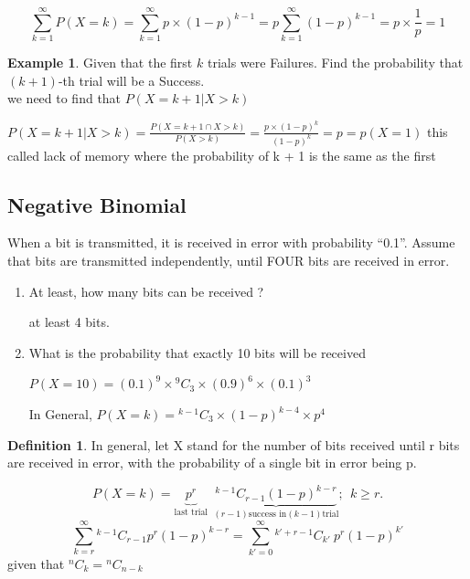 \documentclass[12pt]{article}
\theoremstyle{definition}
\newtheorem{exmp}{Example}[section]
\newtheorem{slo}{Definition}[section]
\newcommand*{\Comb}[2]{{}^{#1}C_{#2}}%
\begin{document}
\begin{equation}
    \displaystyle \sum_{k = 1}^{\infty}   P(X = k) = \sum_{k = 1}^{\infty}p \times (1 - p)^{k-1}
    = p\sum_{k = 1}^{\infty}(1 - p)^{k-1} = p \times \frac{1}{p} = 1
\end{equation}    
\begin{exmp}
    Given that the first $k$ trials were Failures. Find the probability that $(k+1)$-th trial will be a Success. \\

    we need to find that $P(X = k + 1 | X > k)$
    \begin{center}
        $ \displaystyle  P(X = k + 1 | X > k) = \frac{P(X=k+1 \cap X>k)}{P(X>k)}
        = \frac{p \times (1-p)^k}{(1-p)^k} = p = p(X = 1)$  this called lack of memory where the probability
        of k + 1 is the same as the first
    \end{center}
\end{exmp}    
\subsection{Negative Binomial}
When a bit is transmitted, it is received in error with probability “0.1”.
Assume that bits are transmitted independently, until FOUR bits are received in error.
\begin{enumerate}
    \item At least, how many bits can be received ?
        \begin{center}
            at least 4 bits.
        \end{center}   
    \item What is the probability that exactly 10 bits will be received
        \begin{center}
            $  P(X= 10) = (0.1)^9 \times \Comb{9}{3} \times (0.9)^6 \times (0.1)^3 $
        \end{center}   
        In General, $P(X = k) = \Comb{k-1}{3} \times (1-p)^{k-4} \times p^4$

\end{enumerate}   
\begin{slo}
    In general, let X stand for the number of bits
    received until r bits are received in error, with
    the probability of a single bit in error being p.
\end{slo}   
\begin{equation}
    P(X = k) =  \underbrace{p^r}_{\text{last trial}} 
    \ \ \underbrace{\Comb{k-1}{r-1} (1-p)^{k-r}}_{\text{$(r - 1)$success in$(k - 1)$trial}}; \ \ k \geq r. 
\end{equation}
\begin{equation}
    \displaystyle \sum_{k=r}^{\infty} \Comb{k-1}{r-1} p^r(1-p)^{k-r} =
    \sum_{k' = 0}^{\infty} \Comb{k' + r -1}{k'} \ p^r (1-p)^{k'}
\end{equation}
given that $ \displaystyle \Comb{n}{k} = \Comb{n}{n- k}$
\end{document}

